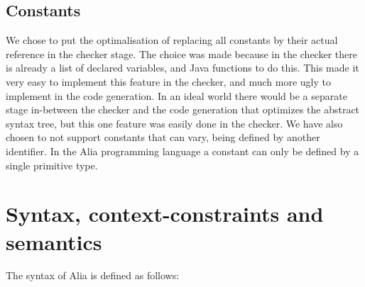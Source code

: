\documentclass[paper=a4, fontsize=11pt]{article}
\numberwithin{equation}{section}		%
\numberwithin{figure}{section}			%
\numberwithin{table}{section}				%
\begin{document}
\subsection{Constants}
We chose to put the optimalisation of replacing all constants by their actual reference in the checker stage. The choice was made because in the checker there is already a list of declared variables, and Java functions to do this. This made it very easy to implement this feature in the checker, and much more ugly to implement in the code generation. In an ideal world there would be a separate stage in-between the checker and the code generation that optimizes the abstract syntax tree, but this one feature was easily done in the checker. We have also chosen to not support constants that can vary, being defined by another identifier. In the Alia programming language a constant can only be defined by a single primitive type.



\section{Syntax, context-constraints and semantics}
The syntax of Alia is defined as follows:
\end{document}
